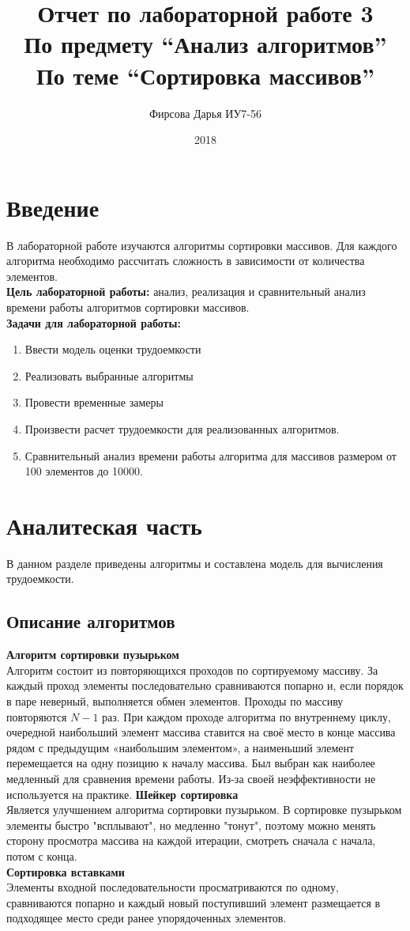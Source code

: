 \documentclass[12pt]{article}
\title{Отчет по лабораторной работе 3 \\ 
	По предмету “Анализ алгоритмов” \\
	По теме “Сортировка массивов”
}
\date{2018}
\author{Фирсова Дарья ИУ7-56}
\begin{document}
  
	\maketitle  
	\newpage
	\section*{Введение}
	В лабораторной работе изучаются алгоритмы сортировки массивов. Для каждого алгоритма необходимо рассчитать сложность в зависимости от количества элементов.\\
	\textbf{Цель лабораторной работы:} анализ, реализация и сравнительный анализ времени работы алгоритмов сортировки массивов. \\
	\textbf{Задачи для лабораторной работы:}
	\begin{enumerate}
	\item Ввести модель оценки трудоемкости
	\item Реализовать выбранные алгоритмы
	\item Провести временные замеры
	\item Произвести расчет трудоемкости для реализованных алгоритмов.
	\item Сравнительный анализ времени работы алгоритма для массивов размером от 100 элементов до 10000.
	\end{enumerate}

\section{Аналитеская часть}
В данном разделе приведены алгоритмы и составлена модель для вычисления трудоемкости.
\subsection{Описание алгоритмов}
\textbf{Алгоритм сортировки пузырьком}
\\Алгоритм состоит из повторяющихся проходов по сортируемому массиву. За каждый проход элементы последовательно сравниваются попарно и, если порядок в паре неверный, выполняется обмен элементов. Проходы по массиву повторяются $N-1$ раз. При каждом проходе алгоритма по внутреннему циклу, очередной наибольший элемент массива ставится на своё место в конце массива рядом с предыдущим «наибольшим элементом», а наименьший элемент перемещается на одну позицию к началу массива. Был выбран как наиболее медленный для сравнения времени работы. Из-за своей неэффективности не используется на практике. 
\newline
\textbf{Шейкер сортировка}
\\Является улучшением алгоритма сортировки пузырьком. В сортировке пузырьком элементы быстро "всплывают", но медленно "тонут", поэтому можно менять сторону просмотра массива на каждой итерации, смотреть сначала с начала, потом с конца.\\
\textbf{Сортировка вставками}
\\ Элементы входной последовательности просматриваются по одному, сравниваются попарно и каждый новый поступивший элемент размещается в подходящее место среди ранее упорядоченных элементов. 
\end{document}
